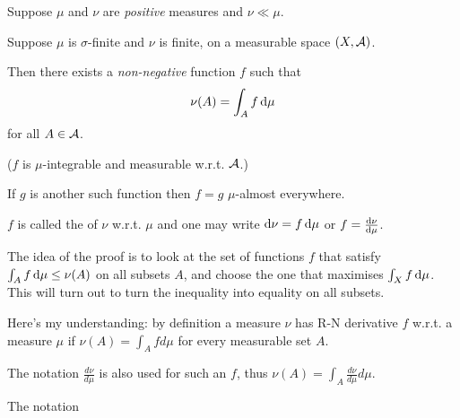 \begin{theorem}
  Suppose $\mu$ and $\nu$ are {\it positive} measures and $\nu \ll \mu$.

  Suppose $\mu$ is $\sigma$-finite and $\nu$ is finite, on a measurable space $(X, \mathcal A)$.

  Then there exists a {\it non-negative} function $f$ such that
  \begin{align*}
  \nu(A) = \int_A f \d\mu
  \end{align*}
  for all $A \in \mathcal A$.

  ($f$ is $\mu$-integrable and measurable w.r.t. $\mathcal A$.)

  If $g$ is another such function then $f = g$ $\mu$-almost everywhere.

  $f$ is called the  of $\nu$ w.r.t. $\mu$ and one may write
  $\d\nu = f\dmu$ or $f = \frac{\d\nu}{\dmu}$.
\end{theorem}

The idea of the proof is to look at the set of functions $f$ that
satisfy $\int_A f \d\mu \leq \nu(A)$ on all subsets $A$, and choose the one that
maximises $\int_X f \dmu$. This will turn out to turn the inequality into equality on all subsets.


Here's my understanding: by definition a measure $\nu$ has R-N derivative $f$ w.r.t. a measure $\mu$ if $\nu(A) = \int_A f d\mu$ for every measurable set $A$.

The notation $\frac{d \nu}{d \mu}$ is also used for such an $f$, thus $\nu(A) = \int_A \frac{d \nu}{d \mu} d\mu$.




The notation $$\frac{}{}$$


